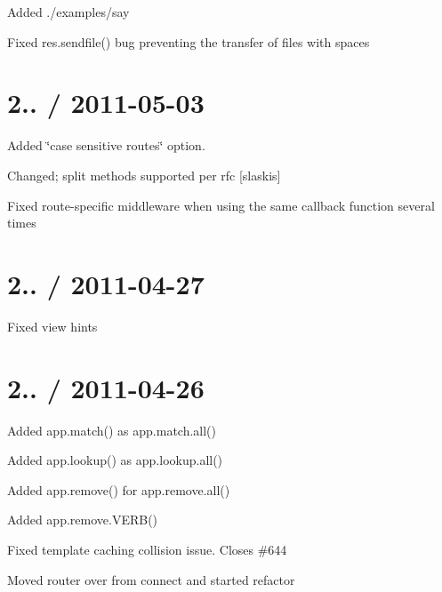 {\ttfamily }

{\ttfamily 
\begin{DoxyItemize}
\item Added {\ttfamily ./examples/say}
\item Fixed {\ttfamily res.\+sendfile()} bug preventing the transfer of files with spaces
\end{DoxyItemize}}

{\ttfamily \section*{2.. / 2011-\/05-\/03 }}

{\ttfamily }

{\ttfamily 
\begin{DoxyItemize}
\item Added \char`\"{}case sensitive routes\char`\"{} option.
\item Changed; split methods supported per rfc \mbox{[}slaskis\mbox{]}
\item Fixed route-\/specific middleware when using the same callback function several times
\end{DoxyItemize}}

{\ttfamily \section*{2.. / 2011-\/04-\/27 }}

{\ttfamily }

{\ttfamily 
\begin{DoxyItemize}
\item Fixed view hints
\end{DoxyItemize}}

{\ttfamily \section*{2.. / 2011-\/04-\/26 }}

{\ttfamily }

{\ttfamily 
\begin{DoxyItemize}
\item Added {\ttfamily app.\+match()} as {\ttfamily app.\+match.\+all()}
\item Added {\ttfamily app.\+lookup()} as {\ttfamily app.\+lookup.\+all()}
\item Added {\ttfamily app.\+remove()} for {\ttfamily app.\+remove.\+all()}
\item Added {\ttfamily app.\+remove.\+V\+E\+R\+B()}
\item Fixed template caching collision issue. Closes \#644
\item Moved router over from connect and started refactor
\end{DoxyItemize}}

